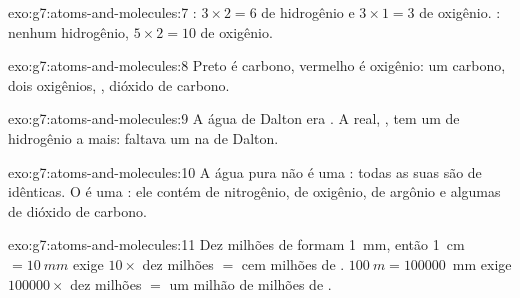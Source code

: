 \begin{solution}{exo:g7:atoms-and-molecules:7}
: $3\times 2 = 6$  de hidrogênio e $3\times 1 = 3$ 
de oxigênio. : nenhum hidrogênio, $5\times 2 = 10$  de oxigênio.
\end{solution}

\begin{solution}{exo:g7:atoms-and-molecules:8}
Preto é carbono, vermelho é oxigênio: um carbono, dois oxigênios,
, dióxido de carbono.
\end{solution}

\begin{solution}{exo:g7:atoms-and-molecules:9}
A água de Dalton era . A  real, , tem um  de
hidrogênio a mais: faltava um  na  de Dalton.
\end{solution}

\begin{solution}{exo:g7:atoms-and-molecules:10}
A água pura não é uma : todas as suas  são  de
 idênticas. O  é uma : ele contém  de
nitrogênio,  de oxigênio,  de argônio e algumas 
de dióxido de carbono.
\end{solution}

\begin{solution}{exo:g7:atoms-and-molecules:11}
Dez milhões de  formam \qty{1}{mm}, então \qty{1}{cm} $= \qty{10}{mm}$
exige $10 \times$ dez milhões $=$ cem milhões de .
$\qty{100}{m} = \num{100000}$~mm exige $\num{100000}\times$ dez milhões
$=$ um milhão de milhões de .
\end{solution}

